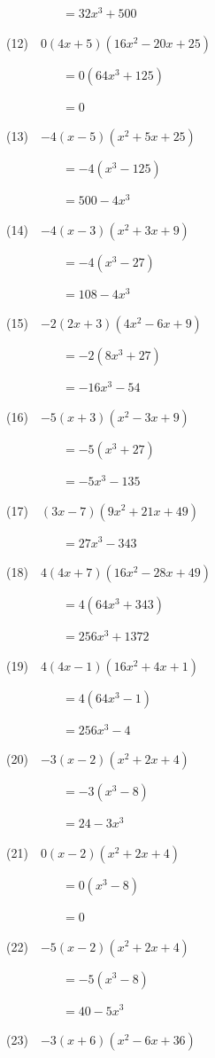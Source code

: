 \documentclass[a4j,twocolumn,10pt,fleqn]{jarticle}
\begin{document}
~~~~~~~~~$=32 x^{3} + 500$

(12)~~$0\left(4 x + 5\right) \left(16 x^{2} - 20 x + 25\right)$

~~~~~~~~~$=0(64 x^{3} + 125)$

~~~~~~~~~$=0$

(13)~~$-4\left(x - 5\right) \left(x^{2} + 5 x + 25\right)$

~~~~~~~~~$=-4(x^{3} - 125)$

~~~~~~~~~$=500 - 4 x^{3}$

(14)~~$-4\left(x - 3\right) \left(x^{2} + 3 x + 9\right)$

~~~~~~~~~$=-4(x^{3} - 27)$

~~~~~~~~~$=108 - 4 x^{3}$

(15)~~$-2\left(2 x + 3\right) \left(4 x^{2} - 6 x + 9\right)$

~~~~~~~~~$=-2(8 x^{3} + 27)$

~~~~~~~~~$=- 16 x^{3} - 54$

(16)~~$-5\left(x + 3\right) \left(x^{2} - 3 x + 9\right)$

~~~~~~~~~$=-5(x^{3} + 27)$

~~~~~~~~~$=- 5 x^{3} - 135$

(17)~~$\left(3 x - 7\right) \left(9 x^{2} + 21 x + 49\right)$

~~~~~~~~~$=27 x^{3} - 343$

(18)~~$4\left(4 x + 7\right) \left(16 x^{2} - 28 x + 49\right)$

~~~~~~~~~$=4(64 x^{3} + 343)$

~~~~~~~~~$=256 x^{3} + 1372$

(19)~~$4\left(4 x - 1\right) \left(16 x^{2} + 4 x + 1\right)$

~~~~~~~~~$=4(64 x^{3} - 1)$

~~~~~~~~~$=256 x^{3} - 4$

(20)~~$-3\left(x - 2\right) \left(x^{2} + 2 x + 4\right)$

~~~~~~~~~$=-3(x^{3} - 8)$

~~~~~~~~~$=24 - 3 x^{3}$

(21)~~$0\left(x - 2\right) \left(x^{2} + 2 x + 4\right)$

~~~~~~~~~$=0(x^{3} - 8)$

~~~~~~~~~$=0$

(22)~~$-5\left(x - 2\right) \left(x^{2} + 2 x + 4\right)$

~~~~~~~~~$=-5(x^{3} - 8)$

~~~~~~~~~$=40 - 5 x^{3}$

(23)~~$-3\left(x + 6\right) \left(x^{2} - 6 x + 36\right)$
\end{document}
